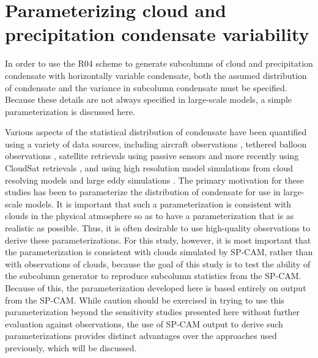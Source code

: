 \section{Parameterizing cloud and precipitation condensate
variability}\label{sec:subgrid2Variability}

In order to use the R04 scheme to generate subcolumns of cloud and
precipitation condensate with horizontally variable condensate, both the
assumed distribution of condensate and the variance in subcolumn
condensate must be specified. Because these details are not always
specified in large-scale models, a simple parameterization is discussed
here.

Various aspects of the statistical distribution of condensate have been
quantified using a variety of data sources, including aircraft
observations \citep{wood_and_field_2000, larson_et_al_2001}, tethered
balloon observations \citep{price_2001}, satellite retrievals using
passive sensors \citep{barker_et_al_1996} and more recently using
CloudSat retrievals \citep{lee_et_al_2010}, and using high resolution
model simulations from cloud resolving models and large eddy simulations
\citep{lewellen_and_yoh_1993, xu_and_randall_1996a, xu_and_randall_1996b}.
The primary motivation for these studies has been to parameterize the
distribution of condensate for use in large-scale models. It is
important that such a parameterization is consistent with clouds in the
physical atmosphere so as to have a parameterization that is as
realistic as possible. Thus, it is often desirable to use high-quality
observations to derive these parameterizations. For this study, however,
it is most important that the parameterization is consistent with clouds
simulated by SP-CAM, rather than with observations of clouds, because
the goal of this study is to test the ability of the subcolumn generator
to reproduce subcolumn statistics from the SP-CAM. Because of this, the
parameterization developed here is based entirely on output from the
SP-CAM. While caution should be exercised in trying to use this
parameterization beyond the sensitivity studies presented here without
further evaluation against observations, the use of SP-CAM output to
derive such parameterizations provides distinct advantages over the
approaches used previously, which will be discussed.

